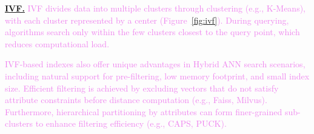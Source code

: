 \documentclass[sigconf, nonacm]{acmart}
\begin{document}
	
	\noindent\textbf{\underline{IVF.}} 
	\textcolor{violet}{IVF divides data into multiple clusters through clustering (e.g., K-Means), with each cluster represented by a center (Figure~\ref{fig:ivf}). During querying, algorithms search only within the few clusters closest to the query point, which reduces computational load.}
	
	\textcolor{violet}{IVF-based indexes also offer unique advantages in Hybrid ANN search scenarios, including natural support for pre-filtering, low memory footprint, and small index size. Efficient filtering is achieved by excluding vectors that do not satisfy attribute constraints before distance computation (e.g., Faiss, Milvus). Furthermore, hierarchical partitioning by attributes can form finer-grained sub-clusters to enhance filtering efficiency (e.g., CAPS, PUCK).}
%	
%	
	
\end{document}

